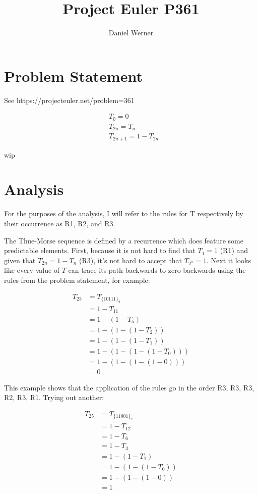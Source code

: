 \documentclass{article}
\title{Project Euler P361}
\author{Daniel Werner}
\begin{document}
\maketitle

\section*{Problem Statement}

See https://projecteuler.net/problem=361

\begin{align*}
    &T_0 = 0 \\
    &T_{2n} = T_n \\
    &T_{2n + 1} = 1 - T_{2n}
\end{align*}

wip

\section*{Analysis}

For the purposes of the analysis, I will refer to the rules for T respectively by their occurrence as R1, R2, and R3.

\par

The Thue-Morse sequence is defined by a recurrence which does feature some predictable elements.  First, because it is not hard to find that $T_1 = 1$ (R1) and given that $T_{2n} = 1 - T_n$ (R3), it's not hard to accept that $T_{2^n} = 1$.  Next it looks like every value of $T$ can trace its path backwards to zero backwards using the rules from the problem statement, for example:

\begin{align*}
    T_{23} &= T_{\{10111\}_2} \\
    &= 1 - T_{11} \\ 
    &= 1 - (1 - T_5) \\
    &= 1 - (1 - (1 - T_2)) \\
    &= 1 - (1 - (1 - T_1)) \\
    &= 1 - (1 - (1 - (1 - T_0))) \\
    &= 1 - (1 - (1 - (1 - 0))) \\
    &= 0
\end{align*}

This example shows that the application of the rules go in the order R3, R3, R3, R2, R3, R1. Trying out another:

\begin{align*}
    T_{25} &= T_{\{11001\}_2} \\
    &= 1 - T_{12} \\ 
    &= 1 - T_6 \\
    &= 1 - T_3 \\
    &= 1 - (1 - T_1) \\
    &= 1 - (1 - (1 - T_0)) \\
    &= 1 - (1 - (1 - 0)) \\
    &= 1
\end{align*}
\end{document}
